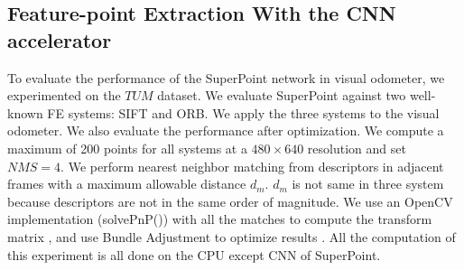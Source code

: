 

\subsection{ Feature-point Extraction With the CNN accelerator }

To evaluate the performance of the SuperPoint network in visual odometer, we experimented on the $TUM$ dataset. We evaluate SuperPoint against two well-known FE systems: SIFT\cite{Lowe-478} and ORB\cite{RubleeRabaud-479}. We apply the three systems to the visual odometer. We also evaluate the performance after optimization. We compute a maximum of 200 points for all systems at a $480\times640$ resolution and set $NMS=4$. We perform nearest neighbor matching from descriptors in adjacent frames with a maximum allowable distance $d_m$. $d_m$ is not same in three system because descriptors are not in the same order of magnitude. We use an OpenCV implementation (solvePnP()) with all the matches to compute the transform matrix \cite{LepetitMoreno-Noguer-EPnP}, and use Bundle Adjustment to optimize results \cite{TriggsMclauchlan-Bundle-Adjustment}. All the computation of this experiment is all done on the CPU except CNN of SuperPoint. 

